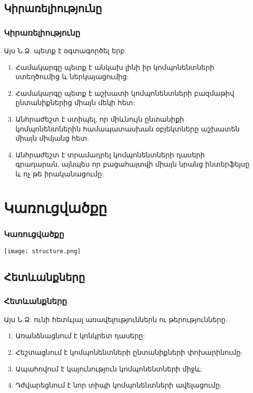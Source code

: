 \documentclass{beamer}
\begin{document}
\subsection{Կիրառելիությունը}
\begin{frame}\frametitle{Կիրառելիությունը}
Այս Ն.Ձ. պետք է օգտագործել երբ.
\vfill
\begin{enumerate}
    \item Համակարգը պետք է անկախ լինի իր կոմպոնենտների ստեղծումից և ներկայացումից: \pause \vfill
    \item Համակարգը պետք է աշխատի կոմպոնենտների բազմաթիվ ընտանիքներից միայն մեկի հետ: \pause \vfill
    \item Անհրաժեշտ է ստիպել, որ միևնույն ընտանիքի կոմպոնենտներին համապատասխան
    օբյեկտները աշխատեն միայն միմյանց հետ: \pause \vfill
    \item Անհրաժեշտ է տրամադրել կոմպոնենտների դասերի գրադարան, այնպես որ բացահայտվի
    միայն նրանց ինտերֆեյսը և ոչ թե իրականացումը:
\end{enumerate}
\end{frame}

\section{Կառուցվածքը}
\begin{frame}\frametitle{Կառուցվածքը}
\begin{center}
    \texttt{[image: structure.png]}
\end{center}
\end{frame}

\subsection{Հետևանքները}
\begin{frame}\frametitle{Հետևանքները}
Այս Ն.Ձ. ունի հետևյալ առավելություններն ու թերությունները.
\vfill
\begin{enumerate}
    \item Առանձնացնում է կոնկրետ դասերը: \pause \vfill
    \item Հեշտացնում է կոմպոնենտների ընտանիքների փոխարինումը: \pause \vfill
    \item Ապահովում է կայունություն կոմպոնենտների միջև: \pause \vfill
    \item Դժվարեցնում է նոր տիպի կոմպոնենտների ավելացումը:
\end{enumerate}
\end{frame}
\end{document}

